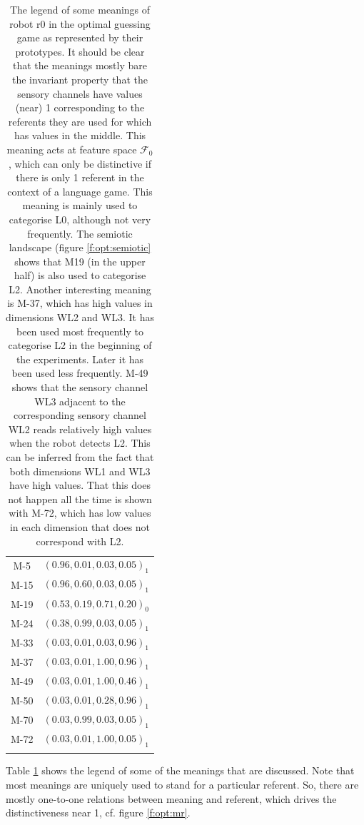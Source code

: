 \begin{table}
\centering
\begin{tabular}{cc}
\lsptoprule
M-5 & $(0.96,0.01,0.03,0.05)_1$\\%
M-15 & $(0.96,0.60,0.03,0.05)_1$\\%
M-19 & $(0.53,0.19,0.71,0.20)_0$\\%
M-24 & $(0.38,0.99,0.03,0.05)_1$\\%
M-33 & $(0.03,0.01,0.03,0.96)_1$\\%
M-37 & $(0.03,0.01,1.00,0.96)_1$\\%
M-49 & $(0.03,0.01,1.00,0.46)_1$\\%
M-50 & $(0.03,0.01,0.28,0.96)_1$\\%
M-70 & $(0.03,0.99,0.03,0.05)_1$\\%
M-72 & $(0.03,0.01,1.00,0.05)_1$\\%
\lspbottomrule
\end{tabular}
\caption{The legend of some meanings of robot r0 in the optimal guessing game as represented by their prototypes. It should be clear that the meanings mostly bare the invariant property that the sensory channels have values (near) 1 corresponding to the referents they are used for which has values in the middle. This meaning acts at feature space ${\mathcal F}_0$, which can only be distinctive if there is only 1 referent in the context of a language game. This meaning is mainly used to categorise L0, although not very frequently. The semiotic landscape (figure \ref{f:opt:semiotic} shows that M19 (in the upper half) is also used to categorise L2. Another interesting meaning is M-37, which has high values in dimensions WL2 and WL3. It has been used most frequently to categorise L2 in the beginning of the experiments. Later it has been used less frequently. M-49 shows that the sensory channel WL3 adjacent to the corresponding sensory channel WL2 reads relatively high values when the robot detects L2. This can be inferred from the fact that both dimensions WL1 and WL3 have high values. That this does not happen all the time is shown with M-72, which has low values in each dimension that does not correspond with L2.}
\label{t:opt:legend}
\end{table}

Table \ref{t:opt:legend} shows the legend of some of the meanings that are discussed. Note that most meanings are uniquely used to stand for a particular referent. So, there are mostly one-to-one relations between meaning and referent, which drives the distinctiveness near 1, cf. figure \ref{f:opt:mr}.

